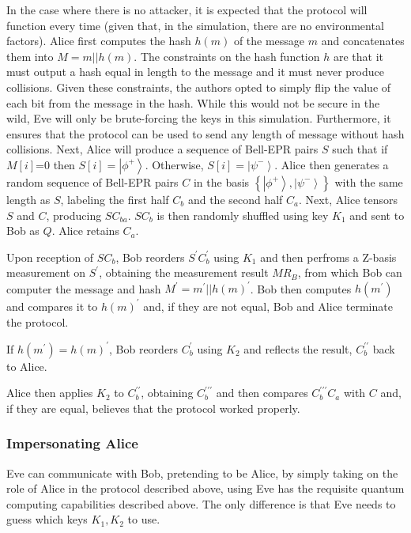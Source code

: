 \documentclass[conference]{IEEEtran}
\begin{document}
In the case where there is no attacker, it is expected that the protocol
will function every time (given that, in the simulation, there are
no environmental factors). Alice first computes the hash $h(m)$ of
the message $m$ and concatenates them into $M=m||h(m)$. The constraints
on the hash function $h$ are that it must output a hash equal in
length to the message and it must never produce collisions. Given
these constraints, the authors opted to simply flip the value of each
bit from the message in the hash. While this would not be secure in
the wild, Eve will only be brute-forcing the keys in this simulation.
Furthermore, it ensures that the protocol can be used to send any
length of message without hash collisions. Next, Alice will produce
a sequence of Bell-EPR pairs $S$ such that if $M[i]$=0 then $S[i]=\left|\phi^{+}\right\rangle $.
Otherwise, $S[i]=\left|\psi^{-}\right\rangle $. Alice then generates
a random sequence of Bell-EPR pairs $C$ in the basis $\left\{ \left|\phi^{+}\right\rangle ,\left|\psi^{-}\right\rangle \right\} $
with the same length as $S$, labeling the first half $C_{b}$ and
the second half $C_{a}$. Next, Alice tensors $S$ and $C$, producing
$SC_{ba}$. $SC_{b}$ is then randomly shuffled using key $K_{1}$
and sent to Bob as $Q$. Alice retains $C_{a}$.

Upon reception of $SC_{b}$, Bob reorders $S^{\prime}C_{b}^{\prime}$
using $K_{1}$ and then perfroms a Z-basis measurement on $S^{\prime}$,
obtaining the measurement result $MR_{B}$, from which Bob can computer
the message and hash $M^{\prime}=m^{\prime}||h\left(m\right)^{\prime}$.
Bob then computes $h\left(m^{\prime}\right)$ and compares it to $h\left(m\right)^{\prime}$
and, if they are not equal, Bob and Alice terminate the protocol.

If $h\left(m^{\prime}\right)=h\left(m\right)^{\prime}$, Bob reorders
$C_{b}^{\prime}$ using $K_{2}$ and reflects the result, $C_{b}^{\prime\prime}$
back to Alice.

Alice then applies $K_{2}$ to $C_{b}^{\prime\prime}$, obtaining
$C_{b}^{\prime\prime\prime}$ and then compares $C_{b}^{\prime\prime\prime}C_{a}$
with $C$ and, if they are equal, believes that the protocol worked
properly.

\subsubsection{Impersonating Alice}

Eve can communicate with Bob, pretending to be Alice, by simply taking
on the role of Alice in the protocol described above, using Eve has
the requisite quantum computing capabilities described above. The
only difference is that Eve needs to guess which keys $K_{1},K_{2}$
to use.
\end{document}
